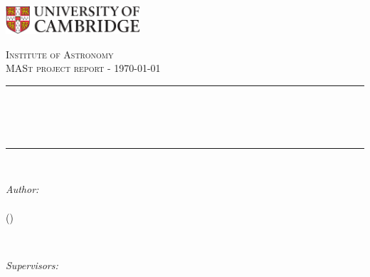 \begin{titlepage}

\newcommand{\HRule}{\rule{\linewidth}{0.5mm}} %


\includegraphics[width = 5cm]{images/cam.pdf}\\[0.5cm] 

\center %


\textsc{\Large Institute of Astronomy}\\[0.5cm] 
\textsc{\large MASt  project report - \today}\\[0.5cm]


\HRule \\[0.4cm]
{ \Huge \bfseries \reporttitle}\\
{ \Large \bfseries \reportsubtitle}\\ %
\HRule \\[1.5cm]
\linespread{1.2}

\begin{minipage}[t]{0.4\textwidth}
\begin{flushleft} \large
\emph{Author:}\\
\reportauthor\\
(\cid)

\end{flushleft}
\end{minipage}
~
\begin{minipage}[t]{0.4\textwidth}
\begin{flushright} \large
\emph{Supervisors:} \\
\supervisorone \\
\supervisortwo \\
\end{flushright}
\end{minipage}\\[2cm]


\end{titlepage}
